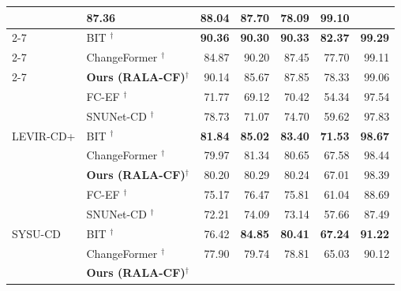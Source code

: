 \begin{table}[htbp]
{\begin{tabularx}{\textwidth}{|l|X|r|r|r|r|r|}
        & 87.36 & 88.04 & 87.70 & 78.09 & 99.10 \\ \cline{2-7}
    & BIT \cite{Chen2022BIT}$^\dagger$
        & \textbf{90.36} & \textbf{90.30} & \textbf{90.33} & \textbf{82.37} & \textbf{99.29} \\ \cline{2-7}
    & ChangeFormer \cite{Bandara2022ChangeFormer}$^\dagger$
        & 84.87 & 90.20 & 87.45 & 77.70 & 99.11 \\ \cline{2-7}
\rowcolor{pastelorange}
    & \textbf{Ours (RALA-CF)}$^\dagger$
        & 90.14 & 85.67 & 87.85 & 78.33 & 99.06 \\
\hline
\multirow{5}{*}{LEVIR-CD+}
    & FC-EF \cite{Daudt2018SiamICIP}$^\dagger$
        & 71.77 & 69.12 & 70.42 & 54.34 & 97.54 \\ \cline{2-7}
    & SNUNet-CD \cite{Fang2021SNUNetCD}$^\dagger$
        & 78.73 & 71.07 & 74.70 & 59.62 & 97.83 \\ \cline{2-7}
    & BIT \cite{Chen2022BIT}$^\dagger$
        & \textbf{81.84} & \textbf{85.02} & \textbf{83.40} & \textbf{71.53} & \textbf{98.67} \\ \cline{2-7}
    & ChangeFormer \cite{Bandara2022ChangeFormer}$^\dagger$
        & 79.97 & 81.34 & 80.65 & 67.58 & 98.44 \\ \cline{2-7}
\rowcolor{pastelorange}
    & \textbf{Ours (RALA-CF)}$^\dagger$
        & 80.20 & 80.29 & 80.24 & 67.01 & 98.39 \\
\hline
\multirow{5}{*}{SYSU-CD}
    & FC-EF \cite{Daudt2018SiamICIP}$^\dagger$
        & 75.17 & 76.47 & 75.81 & 61.04 & 88.69 \\
        \cline{2-7}
    & SNUNet-CD \cite{Fang2021SNUNetCD}$^\dagger$
        & 72.21 & 74.09 & 73.14 & 57.66 & 87.49 \\
        \cline{2-7}
    & BIT \cite{Chen2022BIT}$^\dagger$
        & 76.42 & \textbf{84.85} & \textbf{80.41} & \textbf{67.24} & \textbf{91.22} \\
        \cline{2-7}
    & ChangeFormer \cite{Bandara2022ChangeFormer}$^\dagger$
            & 77.90 & 79.74 & 78.81 & 65.03 & 90.12 \\
            \cline{2-7}
\rowcolor{pastelorange}
    & \textbf{Ours (RALA-CF)}$^\dagger$

\end{tabularx}}
\end{table}
